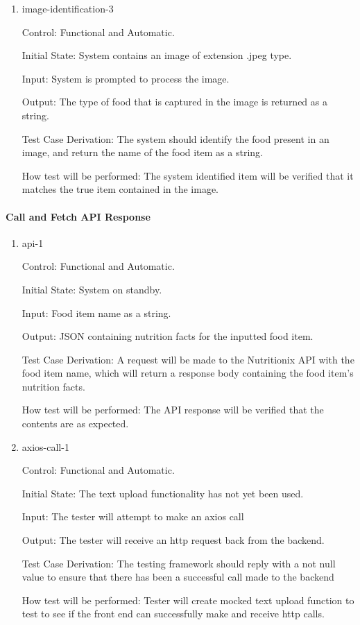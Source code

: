 \documentclass[12pt, titlepage]{article}
\begin{document}
\begin{enumerate}
		\item{image-identification-3\\}
		
		Control: Functional and Automatic.
		
		Initial State: System contains an image of extension .jpeg type.
		
		Input: System is prompted to process the image.
		
		Output: The type of food that is captured in the image is returned as a 
		string.
		
		Test Case Derivation: The system should identify the food present in an 
		image, and return the name of the food item as a string.
		
		How test will be performed: The system identified item will be verified 
		that it matches the true item contained in the image.
		
	\end{enumerate}
	
	\paragraph{Call and Fetch API Response}
	
	\begin{enumerate}
		
		\item{api-1\\}
		
		Control: Functional and Automatic.
		
		Initial State: System on standby.
		
		Input: Food item name as a string.
		
		Output: JSON containing nutrition facts for the inputted food item.
		
		Test Case Derivation: A request will be made to the Nutritionix API 
		with the food item name, which will return a response body containing 
		the food item's nutrition facts.
		
		How test will be performed: The API response will be verified that the 
		contents are as expected.
		
		\item{axios-call-1\\}
		
		Control: Functional and Automatic.
		
		Initial State: The text upload functionality has not yet been used.
		
		Input: The tester will attempt to make an axios call
		
		Output: The tester will receive an http request back from the backend.
		
		Test Case Derivation: The testing framework should reply with a not null value to ensure that there has been a successful call made to the backend
		
		How test will be performed: Tester will create mocked text upload function to test to see if the front end can successfully make and receive http calls.
		
	\end{enumerate}
	
\end{document}
